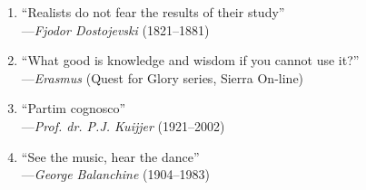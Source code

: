 \documentclass[11pt,b5paper]{article}
\begin{document}
\begin{flushleft}
\begin{enumerate}
	\item{``Realists do not fear the results of their study''\\---{\it Fjodor Dostojevski} (1821--1881)}
	\item{``What good is knowledge and wisdom if you cannot use it?''\\---{\it Erasmus} (Quest for Glory series, Sierra On-line)}
	\item{``Partim cognosco''\\---{\it Prof. dr. P.J. Kuijjer} (1921--2002)}
	\item{``See the music, hear the dance''\\---{\it George Balanchine} (1904--1983)}
\end{enumerate}
\end{flushleft}
\end{document}
